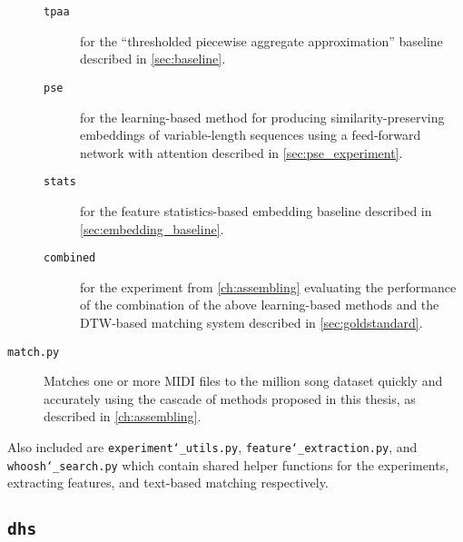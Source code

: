 \begin{description}
\begin{description}
\item[\texttt{tpaa}] for the ``thresholded piecewise aggregate approximation'' baseline described in \cref{sec:baseline}.
\item[\texttt{pse}] for the learning-based method for producing similarity-preserving embeddings of variable-length sequences using a feed-forward network with attention described in \cref{sec:pse_experiment}.
\item[\texttt{stats}] for the feature statistics-based embedding baseline described in \cref{sec:embedding_baseline}.
\item[\texttt{combined}] for the experiment from \cref{ch:assembling} evaluating the performance of the combination of the above learning-based methods and the DTW-based matching system described in \cref{sec:goldstandard}.
\end{description}
\item[\texttt{match.py}] Matches one or more MIDI files to the million song dataset quickly and accurately using the cascade of methods proposed in this thesis, as described in \cref{ch:assembling}.
\end{description}

Also included are \texttt{experiment\char`_utils.py}, \texttt{feature\char`_extraction.py}, and \texttt{whoosh\char`_search.py} which contain shared helper functions for the experiments, extracting features, and text-based matching respectively.

\subsection{\texttt{dhs}}


